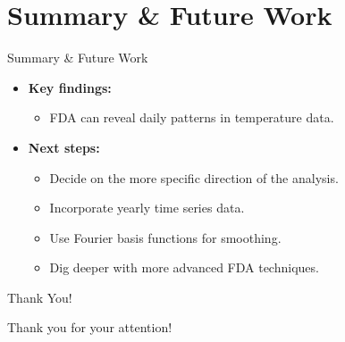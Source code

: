 \documentclass[svgnames, 12pt]{beamer}
\begin{document}
\section{Summary \& Future Work}

\begin{frame}{Summary \& Future Work}
	\begin{itemize}
		\item \textbf{Key findings:}
		\begin{itemize}
			\item FDA can reveal daily patterns in temperature data.
		\end{itemize}
		\item \textbf{Next steps:}
		\begin{itemize}
			\item Decide on the more specific direction of the analysis.
			\item Incorporate yearly time series data.
			\item Use Fourier basis functions for smoothing.
			\item Dig deeper with more advanced FDA techniques.
		\end{itemize}
	\end{itemize}
\end{frame}

\begin{frame}{Thank You!}
	\begin{center}
		\Huge Thank you for your attention!
	\end{center}
\end{frame}
\end{document}
